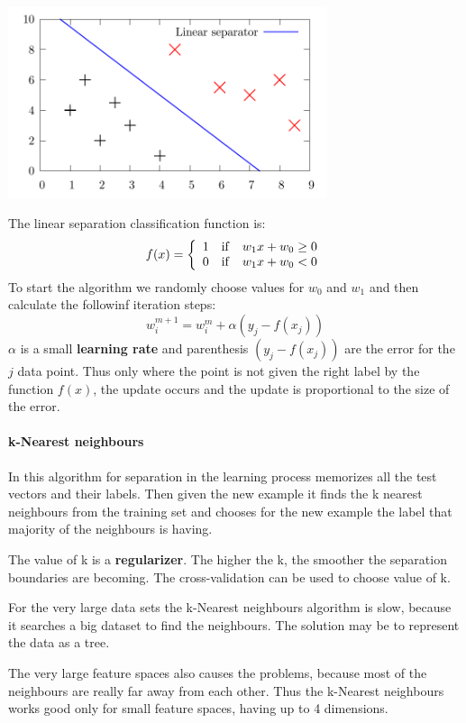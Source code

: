 \documentclass[a4paper,10pt]{article}
\begin{document}
\begin{center}
\includegraphics[width=0.7\textwidth]{PerceptionAlgorithm.pdf}
\end{center}

The linear separation classification function is:
\[
  f(x) = \left\{ 
  \begin{array}{l l l}
    1 & \mathrm{if} & w_1 x + w_0 \geq 0\\
    0 & \mathrm{if} & w_1 x + w_0 < 0\\
  \end{array} \right.
\]
To start the algorithm we randomly choose values for $w_0$ and $w_1$ and then calculate the followinf iteration steps:
\[ w_i^{m+1} = w_i^m + \alpha (y_j - f(x_j) ) \]
$\alpha$ is a small \textbf{learning rate} and parenthesis $(y_j - f(x_j))$ are the error for the $j$ data point. Thus only where the point is not given the right label by the function $f(x)$, the update occurs and the update is proportional to the size of the error.

\paragraph{k-Nearest neighbours}

In this algorithm for separation in the learning process memorizes all the test vectors and their labels. Then given the new example it finds the k nearest neighbours from the training set and chooses for the new example the label that majority of the neighbours is having.

The value of k is a \textbf{regularizer}. The higher the k, the smoother the separation boundaries are becoming. The cross-validation can be used to choose value of k.

For the very large data sets the k-Nearest neighbours algorithm is slow, because it searches a big dataset to find the neighbours. The solution may be to represent the data as a tree.

The very large feature spaces also causes the problems, because most of the neighbours are really far away from each other. Thus the k-Nearest neighbours works good only for small feature spaces, having up to 4 dimensions.
\end{document}
